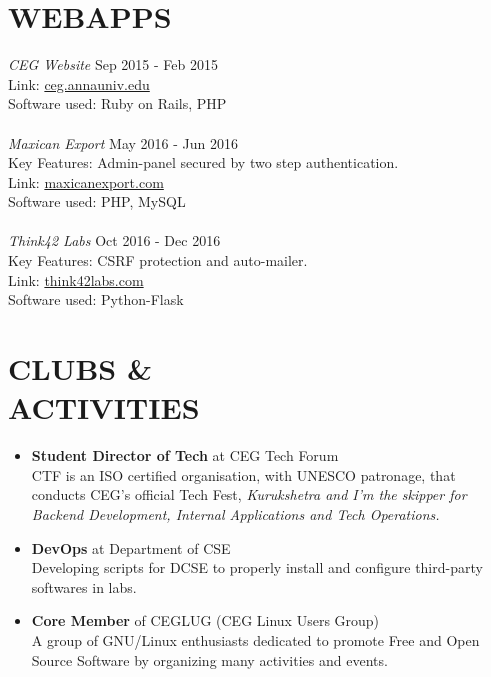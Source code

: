 \documentclass[margin, 10pt]{res} %
\begin{document}
\begin{resume}
\section{WEBAPPS}
{\sl CEG Website} \hfill Sep 2015 - Feb 2015 \\
Link: \href{http://ceg.annauniv.edu}{ceg.annauniv.edu} \\
Software used: Ruby on Rails, PHP \\
\\
{\sl Maxican Export} \hfill May 2016 - Jun 2016 \\
Key Features: Admin-panel secured by two step authentication. \\
Link: \href{http://maxicanexport.com}{maxicanexport.com} \\
Software used: PHP, MySQL \\
\\
{\sl Think42 Labs} \hfill Oct 2016 - Dec 2016 \\
Key Features: CSRF protection and auto-mailer.\\
Link: \href{http://think42labs.com}{think42labs.com} \\
Software used: Python-Flask
\section{CLUBS \& \\ ACTIVITIES}
\begin{itemize}
\item \textbf{Student Director of Tech} at CEG Tech Forum \\
CTF is an ISO certified organisation, with UNESCO patronage, that conducts CEG's official Tech Fest, \sl{Kurukshetra} and I'm the skipper for Backend Development, Internal Applications and Tech Operations.
\item \textbf{DevOps} at Department of CSE \\
Developing scripts for DCSE to properly install and configure third-party softwares in labs.
\item \textbf{Core Member} of CEGLUG (CEG Linux Users Group) \\
A group of GNU/Linux enthusiasts dedicated to promote Free and Open Source Software by organizing many activities and events.
\end{itemize}

\end{resume}
\end{document}
